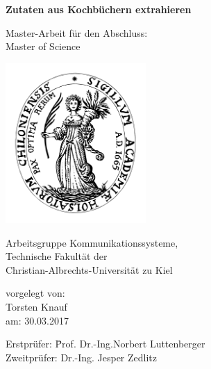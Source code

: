 \documentclass[12pt, twoside]{report}
\begin{document}
\begin{titlepage}
    \begin{center}
        \vspace*{1cm}
        
        \Huge{\textbf{Zutaten aus Kochbüchern extrahieren}}
        
        
        \vspace{1cm}
        
        \Large
        Master-Arbeit für den Abschluss:\\
        Master of Science
        
        \vspace{0.8cm}
        
        \includegraphics[width=0.4\textwidth]{Images/cau-siegel.pdf}
        
        Arbeitsgruppe Kommunikationssysteme,\\
        Technische Fakultät der\\
        Christian-Albrechts-Universität zu Kiel\\
        
        \vspace{1cm}
        
            \Large vorgelegt von:\\
            \LARGE Torsten Knauf\\
            \Large am: 30.03.2017
    \end{center}
    
    \vspace{1cm}
    
    \LARGE
    \begin{tabbing}
    Erstprüfer:\hspace{0.5cm} \= Prof. Dr.-Ing.Norbert Luttenberger\\
    Zweitprüfer: \> Dr.-Ing. Jesper Zedlitz
    \end{tabbing}
\end{titlepage}
\end{document}
